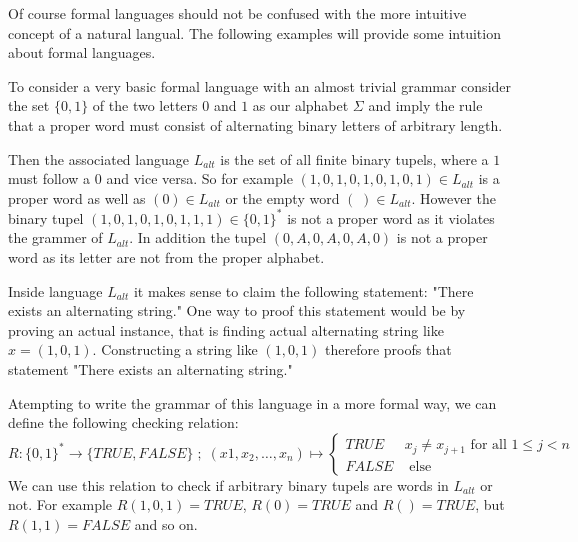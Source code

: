 Of course formal languages should not be confused with the more intuitive concept of a natural langual. The following examples will provide some intuition about formal languages.
\begin{example} To consider a very basic formal language with an almost trivial grammar consider the set $\{0,1\}$ of the two letters $0$ and $1$ as our alphabet $\Sigma$ and imply the rule that a proper word must consist of alternating binary letters of arbitrary length. 

Then the associated language $L_{alt}$ is the set of all finite binary tupels, where a $1$ must follow a $0$ and vice versa. So for example $(1,0,1,0,1,0,1,0,1)\in L_{alt}$ is a proper word as well as $(0)\in L_{alt}$ or the empty word $(\;)\in L_{alt}$. However the binary tupel $(1,0,1,0,1,0,1,1,1)\in \{0,1\}^*$ is not a proper word as it violates the grammer of $L_{alt}$. In addition the tupel $(0,A,0,A,0,A,0)$ is not a proper word as its letter are not from the proper alphabet. 

Inside language $L_{alt}$ it makes sense to claim the following statement: "There exists an alternating string." One way to proof this statement would be by proving an actual instance, that is finding actual alternating string like 
$x = (1,0,1)$. Constructing a string like $(1,0,1)$ therefore proofs that statement "There exists an alternating string."

Atempting to write the grammar of this language in a more formal way, we can define the following checking relation:
$$
R: \{0,1\}^* \to \{TRUE,FALSE\}\;;\; (x1,x_2,\ldots,x_n) \mapsto 
\begin{cases}
TRUE & x_j \neq x_{j+1} \text{ for all } 1\leq j < n \\
FALSE & \text{ else}
\end{cases}
$$
We can use this relation to check if arbitrary binary tupels are words in $L_{alt}$ or not. For example $R(1,0,1)=TRUE$, $R(0)=TRUE$ and $R()=TRUE$, but $R(1,1)=FALSE $ and so on. 
\end{example}
